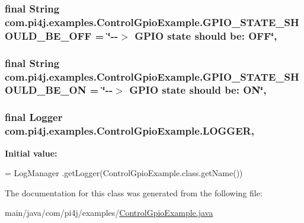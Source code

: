 \subsubsection[{G\+P\+I\+O\+\_\+\+S\+T\+A\+T\+E\+\_\+\+S\+H\+O\+U\+L\+D\+\_\+\+B\+E\+\_\+\+O\+F\+F}]{\setlength{\rightskip}{0pt plus 5cm}final String com.\+pi4j.\+examples.\+Control\+Gpio\+Example.\+G\+P\+I\+O\+\_\+\+S\+T\+A\+T\+E\+\_\+\+S\+H\+O\+U\+L\+D\+\_\+\+B\+E\+\_\+\+O\+F\+F = \char`\"{}-\/-\/$>$ G\+P\+I\+O state should be\+: O\+F\+F\char`\"{}\hspace{0.3cm}{\ttfamily [static]}, {\ttfamily [private]}}\label{classcom_1_1pi4j_1_1examples_1_1ControlGpioExample_acaeee22e7f3420a61219aa5b3220b670}
\hypertarget{classcom_1_1pi4j_1_1examples_1_1ControlGpioExample_aa4cacfc43dedb8d8b9e1c6bc1fec882f}{}
\subsubsection[{G\+P\+I\+O\+\_\+\+S\+T\+A\+T\+E\+\_\+\+S\+H\+O\+U\+L\+D\+\_\+\+B\+E\+\_\+\+O\+N}]{\setlength{\rightskip}{0pt plus 5cm}final String com.\+pi4j.\+examples.\+Control\+Gpio\+Example.\+G\+P\+I\+O\+\_\+\+S\+T\+A\+T\+E\+\_\+\+S\+H\+O\+U\+L\+D\+\_\+\+B\+E\+\_\+\+O\+N = \char`\"{}-\/-\/$>$ G\+P\+I\+O state should be\+: O\+N\char`\"{}\hspace{0.3cm}{\ttfamily [static]}, {\ttfamily [private]}}\label{classcom_1_1pi4j_1_1examples_1_1ControlGpioExample_aa4cacfc43dedb8d8b9e1c6bc1fec882f}
\hypertarget{classcom_1_1pi4j_1_1examples_1_1ControlGpioExample_ac666eb8867a23cf072b3f5c05e9bb061}{}
\subsubsection[{L\+O\+G\+G\+E\+R}]{\setlength{\rightskip}{0pt plus 5cm}final Logger com.\+pi4j.\+examples.\+Control\+Gpio\+Example.\+L\+O\+G\+G\+E\+R\hspace{0.3cm}{\ttfamily [static]}, {\ttfamily [private]}}\label{classcom_1_1pi4j_1_1examples_1_1ControlGpioExample_ac666eb8867a23cf072b3f5c05e9bb061}
{\bfseries Initial value\+:}
\begin{DoxyCode}
= LogManager
            .getLogger(ControlGpioExample.class.getName())
\end{DoxyCode}


The documentation for this class was generated from the following file\+:\begin{DoxyCompactItemize}
\item 
main/java/com/pi4j/examples/\hyperlink{ControlGpioExample_8java}{Control\+Gpio\+Example.\+java}\end{DoxyCompactItemize}
